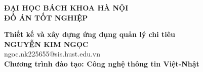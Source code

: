 \documentclass[DoAn.tex]{subfiles}
\begin{document}
\begin{titlepage}
\thispagestyle{empty}
\begin{center}

{\textbf{\large{ĐẠI HỌC BÁCH KHOA HÀ NỘI}}}\\[4cm]

{\textbf{\huge{ ĐỒ ÁN TỐT NGHIỆP}}}\\[1cm]
{\textbf{\Large{Thiết kế và xây dựng ứng dụng quản lý chi tiêu}}\\[1cm]

{\textbf{\large{NGUYỄN KIM NGỌC}}}\\
{\large{ngoc.nk225655@sis.hust.edu.vn}}\\[0.5cm]

{\textbf{\large{Chương trình đào tạo: Công nghệ thông tin Việt-Nhật
}}}\\

\vspace{4cm}
\begin{table}[H]
\centering
{}
\end{table}}
\end{center}



\end{titlepage}
\end{document}
